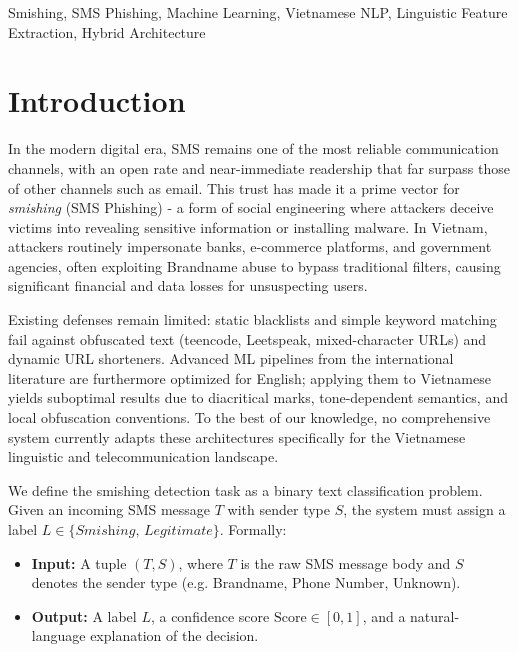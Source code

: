 \documentclass[conference]{IEEEtran}
\begin{document}
\begin{IEEEkeywords}
Smishing, SMS Phishing, Machine Learning, Vietnamese NLP,
Linguistic Feature Extraction, Hybrid Architecture
\end{IEEEkeywords}

\section{Introduction}

In the modern digital era, SMS remains one of the most reliable communication
channels, with an open rate and near-immediate readership that far surpass those of other channels such as email.
This trust has made it a prime vector for \textit{smishing} (SMS Phishing) - a
form of social engineering where attackers deceive victims into revealing
sensitive information or installing malware. In Vietnam, attackers routinely
impersonate banks, e-commerce platforms, and government agencies, often
exploiting Brandname abuse to bypass traditional filters, causing significant
financial and data losses for unsuspecting users.

Existing defenses remain limited: static blacklists and simple keyword
matching fail against obfuscated text (teencode, Leetspeak, mixed-character
URLs) and dynamic URL shorteners. Advanced ML pipelines from the international
literature are furthermore optimized for English; applying them to Vietnamese
yields suboptimal results due to diacritical marks, tone-dependent semantics,
and local obfuscation conventions. To the best of our knowledge, no
comprehensive system currently adapts these architectures specifically for
the Vietnamese linguistic and telecommunication landscape.

We define the smishing detection task as a binary text classification problem.
Given an incoming SMS message $T$ with sender type $S$, the system must assign
a label $L \in \{\textit{Smishing},\, \textit{Legitimate}\}$. Formally:

\begin{itemize}
    \item \textbf{Input:} A tuple $(T, S)$, where $T$ is the raw SMS message
          body and $S$ denotes the sender type (e.g. Brandname, Phone Number,
          Unknown).
    \item \textbf{Output:} A label $L$, a confidence score
          $\text{Score} \in [0,1]$, and a natural-language explanation of the
          decision.
\end{itemize}
\end{document}
